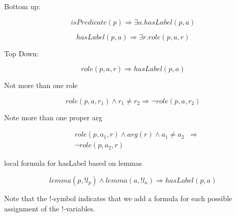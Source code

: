 

Bottom up:

\[
isPredicate\left(p\right)\Rightarrow\exists a.hasLabel\left(p,a\right)\]


\[
hasLabel\left(p,a\right)\Rightarrow\exists r.role\left(p,a,r\right)\]


Top Down:

\[
role\left(p,a,r\right)\Rightarrow hasLabel\left(p,a\right)\]


Not more than one role

\[
role\left(p,a,r_{1}\right)\wedge r_{1}\neq r_{2}\Rightarrow\neg role\left(p,a,r_{2}\right)\]


Note more than one proper arg

\begin{eqnarray*}
 & role\left(p,a_{1},r\right)\wedge arg\left(r\right)\wedge a_{1}\neq a_{2} & \Rightarrow\\
 & \neg role\left(p,a_{2},r\right)\end{eqnarray*}


local formula for hasLabel based on lemmas

\[
lemma\left(p,!l_{p}\right)\wedge lemma\left(a,!l_{a}\right)\Rightarrow hasLabel\left(p,a\right)\]

Note that the $!$-symbol indicates that we add a formula for each possible assignment of the $!$-variables.
